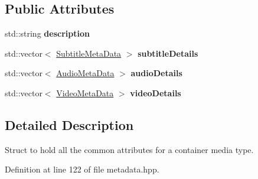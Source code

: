\subsection*{Public Attributes}
\begin{DoxyCompactItemize}
\item 
\hypertarget{structtranscode_1_1ContainerMetaData_a77a95be207cb93b3299b16b22ab37435}{
std::string {\bfseries description}}
\label{structtranscode_1_1ContainerMetaData_a77a95be207cb93b3299b16b22ab37435}

\item 
\hypertarget{structtranscode_1_1ContainerMetaData_abb6c46a666a473437c91383be3cf0a11}{
std::vector$<$ \hyperlink{structtranscode_1_1SubtitleMetaData}{SubtitleMetaData} $>$ {\bfseries subtitleDetails}}
\label{structtranscode_1_1ContainerMetaData_abb6c46a666a473437c91383be3cf0a11}

\item 
\hypertarget{structtranscode_1_1ContainerMetaData_a3c2ee6eac7be55cb351ae3a9ce0d269e}{
std::vector$<$ \hyperlink{structtranscode_1_1AudioMetaData}{AudioMetaData} $>$ {\bfseries audioDetails}}
\label{structtranscode_1_1ContainerMetaData_a3c2ee6eac7be55cb351ae3a9ce0d269e}

\item 
\hypertarget{structtranscode_1_1ContainerMetaData_a301022de11561b8078dd7869be16884e}{
std::vector$<$ \hyperlink{structtranscode_1_1VideoMetaData}{VideoMetaData} $>$ {\bfseries videoDetails}}
\label{structtranscode_1_1ContainerMetaData_a301022de11561b8078dd7869be16884e}

\end{DoxyCompactItemize}


\subsection{Detailed Description}
Struct to hold all the common attributes for a container media type. 

Definition at line 122 of file metadata.hpp.




